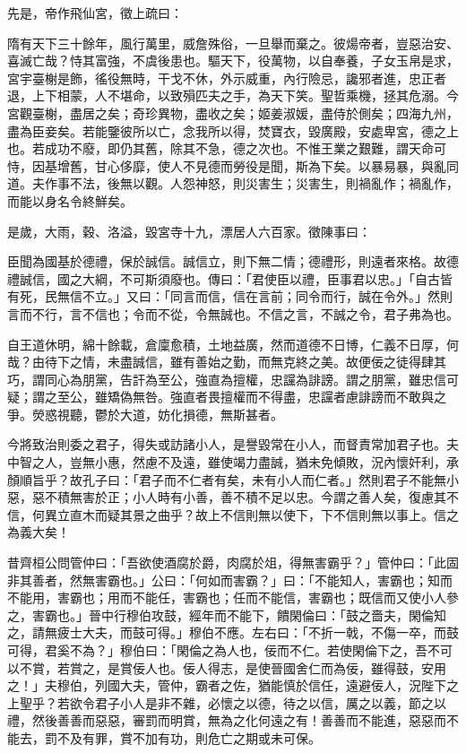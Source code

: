\begin{pinyinscope}
 先是，帝作飛仙宮，徵上疏曰：



 隋有天下三十餘年，風行萬里，威詹殊俗，一旦舉而棄之。彼煬帝者，豈惡治安、喜滅亡哉？恃其富強，不虞後患也。驅天下，役萬物，以自奉養，子女玉帛是求，宮宇臺榭是飾，徭役無時，干戈不休，外示威重，內行險忌，讒邪者進，忠正者退，上下相蒙，人不堪命，以致殞匹夫之手，為天下笑。聖哲乘機，拯其危溺。今宮觀臺榭，盡居之矣；奇珍異物，盡收之矣；姬姜淑媛，盡侍於側矣；四海九州，盡為臣妾矣。若能鑒彼所以亡，念我所以得，焚寶衣，毀廣殿，安處卑宮，德之上也。若成功不廢，即仍其舊，除其不急，德之次也。不惟王業之艱難，謂天命可恃，因基增舊，甘心侈靡，使人不見德而勞役是聞，斯為下矣。以暴易暴，與亂同道。夫作事不法，後無以觀。人怨神怒，則災害生；災害生，則禍亂作；禍亂作，而能以身名令終鮮矣。



 是歲，大雨，穀、洛溢，毀宮寺十九，漂居人六百家。徵陳事曰：



 臣聞為國基於德禮，保於誠信。誠信立，則下無二情；德禮形，則遠者來格。故德禮誠信，國之大綱，不可斯須廢也。傳曰：「君使臣以禮，臣事君以忠。」「自古皆有死，民無信不立。」又曰：「同言而信，信在言前；同令而行，誠在令外。」然則言而不行，言不信也；令而不從，令無誠也。不信之言，不誠之令，君子弗為也。



 自王道休明，綿十餘載，倉廩愈積，土地益廣，然而道德不日博，仁義不日厚，何哉？由待下之情，未盡誠信，雖有善始之勤，而無克終之美。故便佞之徒得肆其巧，謂同心為朋黨，告訐為至公，強直為擅權，忠讜為誹謗。謂之朋黨，雖忠信可疑；謂之至公，雖矯偽無咎。強直者畏擅權而不得盡，忠讜者慮誹謗而不敢與之爭。熒惑視聽，鬱於大道，妨化損德，無斯甚者。



 今將致治則委之君子，得失或訪諸小人，是譽毀常在小人，而督責常加君子也。夫中智之人，豈無小惠，然慮不及遠，雖使竭力盡誠，猶未免傾敗，況內懷奸利，承顏順旨乎？故孔子曰：「君子而不仁者有矣，未有小人而仁者。」然則君子不能無小惡，惡不積無害於正；小人時有小善，善不積不足以忠。今謂之善人矣，復慮其不信，何異立直木而疑其景之曲乎？故上不信則無以使下，下不信則無以事上。信之為義大矣！



 昔齊桓公問管仲曰：「吾欲使酒腐於爵，肉腐於俎，得無害霸乎？」管仲曰：「此固非其善者，然無害霸也。」公曰：「何如而害霸？」曰：「不能知人，害霸也；知而不能用，害霸也；用而不能任，害霸也；任而不能信，害霸也；既信而又使小人參之，害霸也。」晉中行穆伯攻鼓，經年而不能下，饋閑倫曰：「鼓之嗇夫，閑倫知之，請無疲士大夫，而鼓可得。」穆伯不應。左右曰：「不折一戟，不傷一卒，而鼓可得，君奚不為？」穆伯曰：「閑倫之為人也，佞而不仁。若使閑倫下之，吾不可以不賞，若賞之，是賞佞人也。佞人得志，是使晉國舍仁而為佞，雖得鼓，安用之！」夫穆伯，列國大夫，管仲，霸者之佐，猶能慎於信任，遠避佞人，況陛下之上聖乎？若欲令君子小人是非不雜，必懷之以德，待之以信，厲之以義，節之以禮，然後善善而惡惡，審罰而明賞，無為之化何遠之有！善善而不能進，惡惡而不能去，罰不及有罪，賞不加有功，則危亡之期或未可保。




\end{pinyinscope}
